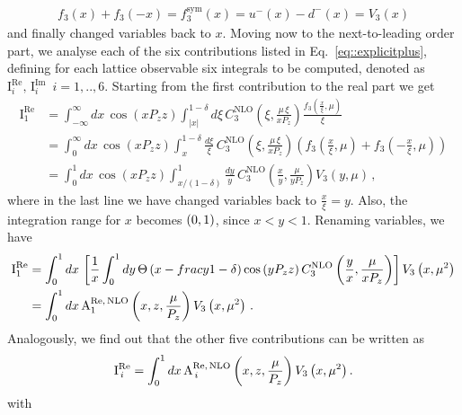 \begin{align} 
	f_3\left(x\right)+f_3\left(-x\right) = f_3^{\text{sym}}\left(x\right) = u^-\left(x\right) - d^-\left(x\right) = V_3\left(x\right) 
\end{align}
and finally changed variables back to $x$.  
Moving now to the next-to-leading order part, we analyse each of the six contributions listed in
Eq.~\eqref{eq::explicitplus}, defining for each lattice observable six integrals
to be computed, denoted as
$\text{I}^{\text{Re}}_i,\,\text{I}^{\text{Im}}_i\,\,\, i = 1,..,6$. Starting
from the first contribution to the real part we get
\begin{align}
	\text{I}^{\text{Re}}_1 
	  & =\int_{-\infty}^{\infty} dx\, \cos\left(x P_z z\right)
	  \int_{|x|}^{1-\delta}d\xi\, 
	  C_3^{\text{NLO}}\left(\xi,\frac{\mu\,\xi}{xP_z}\right)
	  \frac{f_3\left(\frac{x}{\xi},\mu\right)}{\xi} \nonumber \\
	  & = \int_{0}^{\infty} dx\, \cos\left(x P_z z\right)
	  \int_{x}^{1-\delta}\frac{d\xi}{\xi}\,
	  C_3^{\text{NLO}}\left(\xi,\frac{\mu\,\xi}{xP_z}\right)
	  \left(f_3\left(\frac{x}{\xi},\mu\right) + 
	  f_3\left(-\frac{x}{\xi},\mu\right) \right) \nonumber \\
	  & =\int_{0}^{1} dx\, \cos\left(x P_z z\right)
	  \int_{x/(1-\delta)}^{1}\frac{dy}{y}\,
	  C_3^{\text{NLO}}\left(\frac{x}{y},\frac{\mu}{y P_z}\right) V_3\left(y,\mu\right)\, ,
\end{align}
where in the last line we have changed variables back to $\frac{x}{\xi} = y$.
Also, the integration range for $x$ becomes $\left( 0,1 \right)$, since $x<y<1$.
Renaming variables, we have
\begin{align}
	\text{I}^{\text{Re}}_1 
	  & = \int_{0}^{1}dx\,
	  	\left[
			  \frac{1}{x}\int_{0}^{1} dy\, 
			  \Theta\left( x - frac{y}{1-\delta} \right)
			  \cos\left(y P_z z\right) 
			  C_3^{\text{NLO}}\left(\frac{y}{x},\frac{\mu}{x P_z}\right)
		\right]
	V_3\left(x,\mu^2\right) \nonumber \\
	  & = \int_{0}^{1}dx\, 
		  \text{A}^{\text{Re},\,\text{NLO}}_1 \left( x, z, \frac{\mu}{P_z} \right) 
		  V_3\left(x,\mu^2\right)\, . 
\end{align}
Analogously, we find out that the other five contributions can be written as 
\begin{align}
	\text{I}^{\text{Re}}_{\,i} =
	\int_{0}^{1}dx\, \text{A}^{\text{Re},\,\text{NLO}}_{\,i} \left( x, z, \frac{\mu}{P_z} \right) V_3\left(x,\mu^2\right). 
\end{align}
with
